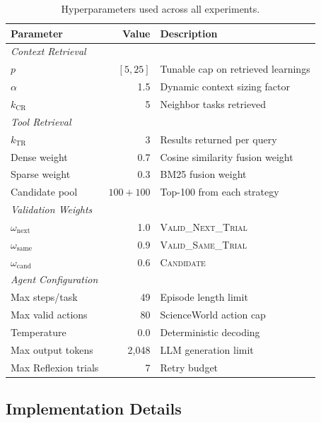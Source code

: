 \begin{table}[h]
\centering
\small
\begin{tabular}{lr p{2.7cm}}
\toprule
\textbf{Parameter} & \textbf{Value} & \textbf{Description} \\
\midrule
\multicolumn{3}{l}{\emph{Context Retrieval}} \\
$p$ & $[5, 25]$ & Tunable cap on retrieved learnings \\
$\alpha$ & 1.5 & Dynamic context sizing factor \\
$k_{\text{CR}}$ & 5 & Neighbor tasks retrieved \\
\midrule
\multicolumn{3}{l}{\emph{Tool Retrieval}} \\
$k_{\text{TR}}$ & 3 & Results returned per query \\
Dense weight & 0.7 & Cosine similarity fusion weight \\
Sparse weight & 0.3 & BM25 fusion weight \\
Candidate pool & $100{+}100$ & Top-100 from each strategy \\
\midrule
\multicolumn{3}{l}{\emph{Validation Weights}} \\
$\omega_{\text{next}}$ & 1.0 & \textsc{Valid\_}\newline\textsc{Next\_Trial} \\
$\omega_{\text{same}}$ & 0.9 & \textsc{Valid\_}\newline\textsc{Same\_Trial} \\
$\omega_{\text{cand}}$ & 0.6 & \textsc{Candidate} \\
\midrule
\multicolumn{3}{l}{\emph{Agent Configuration}} \\
Max steps/task & 49 & Episode length limit \\
Max valid actions & 80 & ScienceWorld action cap \\
Temperature & 0.0 & Deterministic decoding \\
Max output tokens & 2{,}048 & LLM generation limit \\
Max Reflexion trials & 7 & Retry budget \\
\bottomrule
\end{tabular}
\caption{Hyperparameters used across all experiments.}
\label{tab:hyperparameters}
\end{table}

\subsection{Implementation Details}
\label{app:implementation-details}

